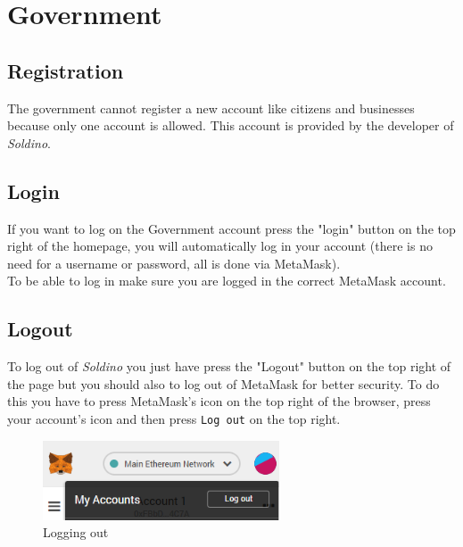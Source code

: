 \section{Government}
	\subsection{Registration}
	The government cannot register a new account like citizens and 
	businesses because only one account is allowed. This account is provided 
	by the developer of \textit{Soldino}.
	\subsection{Login}
	If you want to log on the Government account press the "login" button on the 
	top right of the homepage, you will automatically log in your account 
	(there is no need for a username or password, all is done via MetaMask). 
	\\To be able to log in make sure you are logged in the correct MetaMask\glosp 
	account.
	\subsection{Logout}
	To log out of \textit{Soldino} you just have press the "Logout" button on 
	the top right of the page but you should also to log out of MetaMask\glosp{} 
	for better security. To do this you have to press MetaMask's icon on the top 
	right of the browser, press your account's icon and then press \texttt{Log out}
	on the top right.
	\begin{figure}[H]
		\includegraphics[width=7cm]{res/images/logout_metamask.png}
		\centering
		\caption{Logging out}
	\end{figure}
\pagebreak
